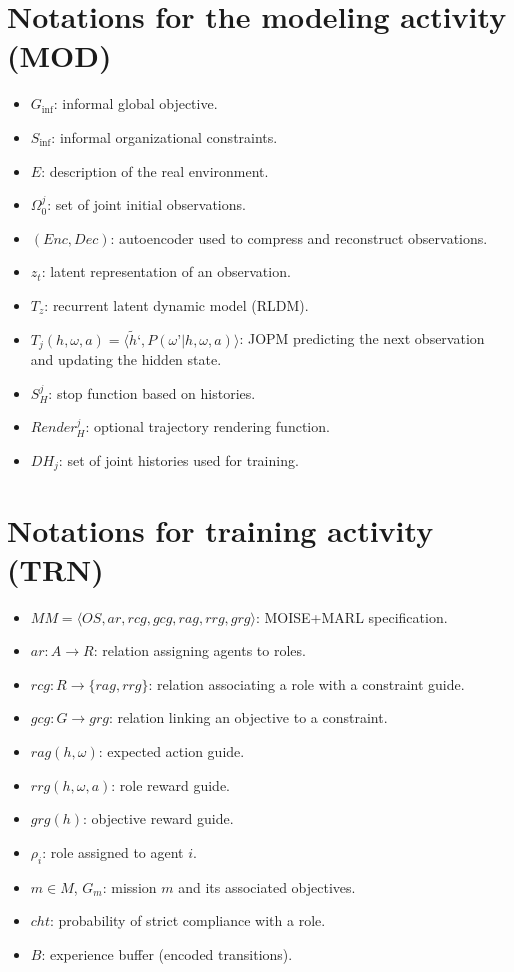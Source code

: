 \section{Notations for the modeling activity (MOD)}
\begin{itemize}
       \item $G_{\text{inf}}$: informal global objective.
       \item $S_{\text{inf}}$: informal organizational constraints.

       \item $E$: description of the real environment.
       \item $\Omega^j_0$: set of joint initial observations.
       \item $(Enc, Dec)$: autoencoder used to compress and reconstruct observations.
       \item $z_t$: latent representation of an observation.
       \item $T_z$: recurrent latent dynamic model (RLDM).
       \item $T_j(h,\omega,a) = \langle \tilde{h}‘, P(\omega’|h,\omega,a)\rangle$: JOPM predicting the next observation and updating the hidden state.
       \item $S^j_H$: stop function based on histories.

       \item $Render^j_H$: optional trajectory rendering function.
       \item $DH_j$: set of joint histories used for training.
\end{itemize}
\section{Notations for training activity (TRN)}
\begin{itemize}
       \item $MM = \langle OS, ar, rcg, gcg, rag, rrg, grg \rangle$: MOISE+MARL specification.
       \item $ar: A \to R$: relation assigning agents to roles.
       \item $rcg: R \to \{rag, rrg\}$: relation associating a role with a constraint guide.

       \item $gcg: G \to grg$: relation linking an objective to a constraint.
       \item $rag(h,\omega)$: expected action guide.
       \item $rrg(h,\omega,a)$: role reward guide.
       \item $grg(h)$: objective reward guide.

       \item $\rho_i$: role assigned to agent $i$.
       \item $m \in M$, $G_m$: mission $m$ and its associated objectives.
       \item $cht$: probability of strict compliance with a role.
       \item $B$: experience buffer (encoded transitions).
\end{itemize}
